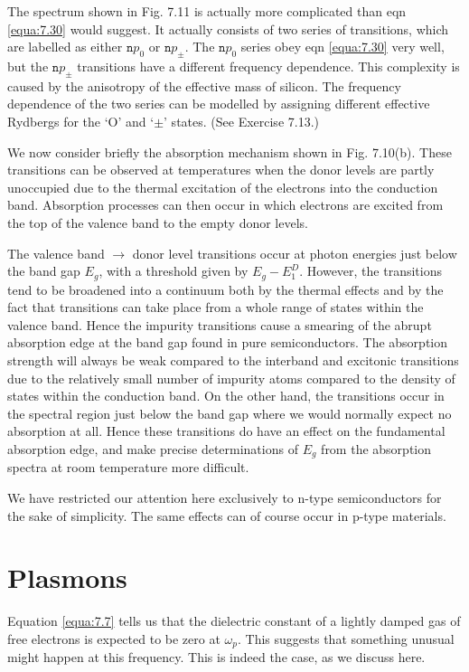 \documentclass[12pt]{book}
\begin{document}
The spectrum shown in Fig. 7.11 is actually more complicated than eqn \ref{equa:7.30} would suggest. It actually consists of two series of transitions, which are labelled as either $\texttt{n}p_0$ or $\texttt{n}p_{\pm}$. The $\texttt{n}p_0$ series obey eqn \ref{equa:7.30} very well, but the $\texttt{n}p_{\pm}$ transitions have a different frequency dependence. This complexity is caused by the anisotropy of the effective mass of silicon. The frequency dependence of the two series can be modelled by assigning different effective Rydbergs for the `O' and `$\pm$' states. (See Exercise 7.13.)

We now consider briefly the absorption mechanism shown in Fig. 7.10(b). These transitions can be observed at temperatures when the donor levels are partly unoccupied due to the thermal excitation of the electrons into the conduction band. Absorption processes can then occur in which electrons are excited from the top of the valence band to the empty donor levels.

The valence band $\rightarrow$ donor level transitions occur at photon energies just below the band gap $E_g$, with a threshold given by $E_g - E_1^D$. However, the transitions tend to be broadened into a continuum both by the thermal effects and by the fact that transitions can take place from a whole range of states within the valence band. Hence the impurity transitions cause a smearing of the abrupt absorption edge at the band gap found in pure semiconductors. The absorption strength will always be weak compared to the interband and excitonic transitions due to the relatively small number of impurity atoms compared to the density of states within the conduction band. On the other hand, the transitions occur in the spectral region just below the band gap where we would normally expect no absorption at all. Hence these transitions do have an effect on the fundamental absorption edge, and make precise determinations of $E_g$ from the absorption spectra at room temperature more difficult.

We have restricted our attention here exclusively to n-type semiconductors for the sake of simplicity. The same effects can of course occur in p-type materials.

\section{Plasmons}
Equation \ref{equa:7.7} tells us that the dielectric constant of a lightly damped gas of free electrons is expected to be zero at $\omega_p$. This suggests that something unusual might happen at this frequency. This is indeed the case, as we discuss here.
\end{document}
